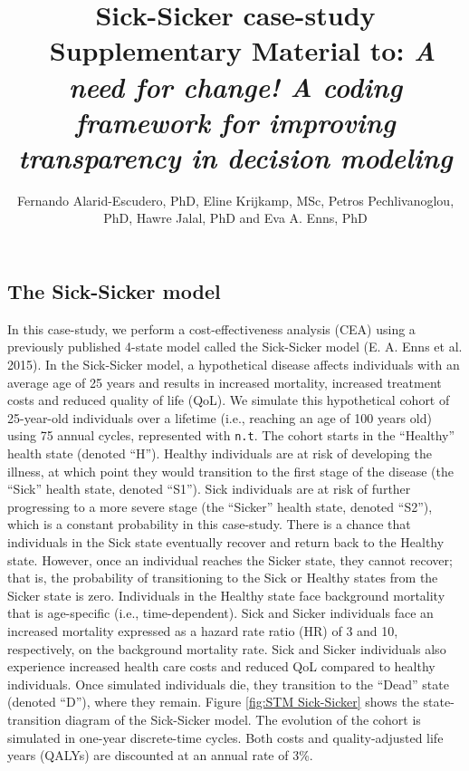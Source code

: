 \documentclass[]{article}
\title{\textbf{Sick-Sicker case-study} ~Supplementary Material to: \emph{A need
for change! A coding framework for improving transparency in decision
modeling}}
\author{Fernando Alarid-Escudero, PhD, Eline Krijkamp, MSc, Petros
Pechlivanoglou, PhD, Hawre Jalal, PhD and Eva A. Enns, PhD}
\date{}
\begin{document}
\maketitle

\subsection{The Sick-Sicker model}\label{the-sick-sicker-model}

In this case-study, we perform a cost-effectiveness analysis (CEA) using
a previously published 4-state model called the Sick-Sicker model (E. A.
Enns et al. 2015). In the Sick-Sicker model, a hypothetical disease
affects individuals with an average age of 25 years and results in
increased mortality, increased treatment costs and reduced quality of
life (QoL). We simulate this hypothetical cohort of 25-year-old
individuals over a lifetime (i.e., reaching an age of 100 years old)
using 75 annual cycles, represented with \texttt{n.t}. The cohort starts
in the ``Healthy'' health state (denoted ``H''). Healthy individuals are
at risk of developing the illness, at which point they would transition
to the first stage of the disease (the ``Sick'' health state, denoted
``S1''). Sick individuals are at risk of further progressing to a more
severe stage (the ``Sicker'' health state, denoted ``S2''), which is a
constant probability in this case-study. There is a chance that
individuals in the Sick state eventually recover and return back to the
Healthy state. However, once an individual reaches the Sicker state,
they cannot recover; that is, the probability of transitioning to the
Sick or Healthy states from the Sicker state is zero. Individuals in the
Healthy state face background mortality that is age-specific (i.e.,
time-dependent). Sick and Sicker individuals face an increased mortality
expressed as a hazard rate ratio (HR) of 3 and 10, respectively, on the
background mortality rate. Sick and Sicker individuals also experience
increased health care costs and reduced QoL compared to healthy
individuals. Once simulated individuals die, they transition to the
``Dead'' state (denoted ``D''), where they remain. Figure
\ref{fig:STM Sick-Sicker} shows the state-transition diagram of the
Sick-Sicker model. The evolution of the cohort is simulated in one-year
discrete-time cycles. Both costs and quality-adjusted life years (QALYs)
are discounted at an annual rate of 3\%.
\end{document}
